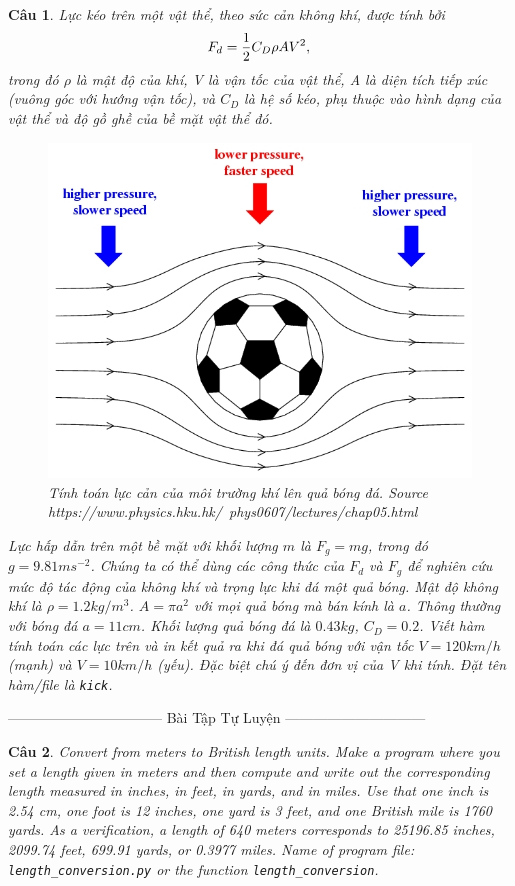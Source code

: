 \documentclass[answers]{exam}
\newtheorem{bt}{Câu}
\begin{document}
\begin{bt} Lực kéo trên một vật thể, theo sức cản không khí, được tính bởi  
%
\[
F_d = \dfrac{1}{2} C_D \rho A V^2, \\
\]
%
trong đó $\rho$ là mật độ của khí, V là vận tốc của vật thể, A là diện tích tiếp xúc 
(vuông góc với hướng vận tốc), và $C_D$ là hệ số kéo, phụ thuộc vào hình dạng của vật thể và độ gồ ghề của bề mặt vật thể đó. 
%
\begin{figure}[!h]
	\centering
	\includegraphics[width=0.7\linewidth]{forces_on_football}
	\caption{Tính toán lực cản của môi trường khí lên quả bóng đá. Source https://www.physics.hku.hk/~phys0607/lectures/chap05.html}
	\label{fig:forcesonfootball}
\end{figure}
%
Lực hấp dẫn trên một bề mặt với khối lượng $m$ là $F_g = mg$, trong đó $g = 9.81m s^{-2}$.
Chúng ta có thể dùng các công thức của $F_d$ và $F_g$ để nghiên cứu mức độ tác động của không khí và trọng lực khi đá một quả bóng. 
Mật độ không khí là $\rho = 1.2 kg/m^3$. 
$A = \pi a^2$ với mọi quả bóng mà bán kính là $a$. Thông thường với bóng đá $a = 11 cm$. 
Khối lượng quả bóng đá là $0.43 kg$, $C_D= 0.2$. 
Viết hàm tính toán các lực trên và in kết quả ra khi đá quả bóng với vận tốc $V = 120 km/h$ (mạnh) và $V = 10 km/h$ (yếu).
Đặc biệt chú ý đến đơn vị của V khi tính. Đặt tên hàm/file là \verb|kick|.
\end{bt}

\centerline{——————————— Bài Tập Tự Luyện  ——————————}

\begin{bt}
	Convert from meters to British length units. Make a program where you set a length given in meters and then
	compute and write out the corresponding length measured in inches, in feet, in yards, and in miles. Use that one inch is 2.54 cm, one foot is
	12 inches, one yard is 3 feet, and one British mile is 1760 yards. As a verification, a length of 640 meters corresponds to 25196.85 inches,
	2099.74 feet, 699.91 yards, or 0.3977 miles. Name of program file: \verb|length_conversion.py| or the function \verb|length_conversion|. 
\end{bt}
\end{document}
